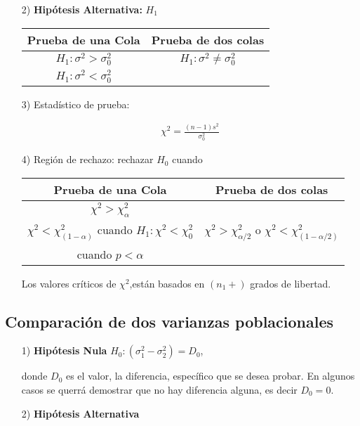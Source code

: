 \begin{itemize}
\begin{itemize}
\item[2) ] \textbf{Hip\'otesis Alternativa: } $H_{1}$

\begin{tabular}{cc}\hline
\textbf{Prueba de una Cola} & \textbf{Prueba de dos colas}\\\hline
$H_{1}:\sigma^{2}>\sigma^{2}_{0}$ & $H_{1}:\sigma^{2}\neq \sigma^{2}_{0}$\\ 
$H_{1}:\sigma^{2}<\sigma^{2}_{0}$&\\
\end{tabular}

\item[3) ] Estad\'istico de prueba:

\begin{eqnarray*}
\chi^{2}=\frac{\left(n-1\right)s^{2}}{\sigma^{2}_{0}}
\end{eqnarray*}

\item[4) ] Regi\'on de rechazo: rechazar $H_{0}$ cuando

\begin{tabular}{cc}\hline
\textbf{Prueba de una Cola} & \textbf{Prueba de dos colas}\\\hline
$\chi^{2}>\chi^{2}_{\alpha}$ & \\
$\chi^{2}<\chi^{2}_{\left(1-\alpha\right)}$ cuando $H_{1}:\chi^{2}<\chi^{2}_{0}$&$\chi^{2}>\chi^{2}_{\alpha/2}$ o $\chi^{2}<\chi^{2}_{\left(1-\alpha/2\right)}$\\
 cuando $p<\alpha$&\\
\end{tabular}

Los valores cr\'iticos de $\chi^{2}$,est\'an basados en $\left(n_{1}+\right)$ grados de libertad.
\end{itemize}


\subsection*{Comparaci\'on de dos varianzas poblacionales}

\begin{itemize}
\item[1) ] \textbf{Hip\'otesis Nula} $H_{0}:\left(\sigma^{2}_{1}-\sigma^{2}_{2}\right)=D_{0}$,\medskip

donde $D_{0}$ es el valor, la diferencia, espec\'ifico que se desea probar. En algunos casos se querr\'a demostrar que no hay diferencia alguna, es decir $D_{0}=0$.

\item[2) ] \textbf{Hip\'otesis Alternativa}


\end{itemize}
\end{itemize}
